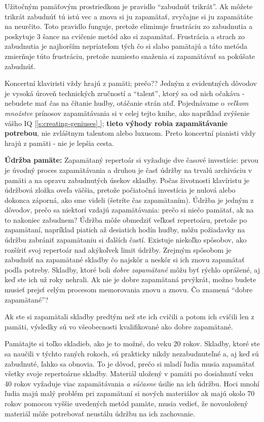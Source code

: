 \documentclass[11pt,a4paper]{book}
\newcommand*{\fullref}[1]{\hyperref[{#1}]{\ref*{#1} \nameref*{#1}}} %
\newcommand*{\fullrefp}[1]{[\fullref{#1}]} %
\begin{document}
Užitočným pamäťovým prostriedkom je pravidlo “zabudnúť trikrát”. Ak môžete trikrát zabudnúť tú istú vec a znova si ju zapamätať, zvyčajne si ju zapamätáte na neurčito. Toto pravidlo funguje, pretože eliminuje frustráciu zo zabudnutia a poskytuje 3 šance na cvičenie metód ako si zapamätať. Frustrácia a strach zo zabudnutia je najhorším nepriateľom tých čo si slabo pamätajú a táto metóda zmierňuje túto frustráciu, pretože namiesto snaženia si zapamätávať sa pokúšate zabudnúť.

Koncertní klaviristi vždy hrajú z pamäti; prečo?? Jedným z evidentných dôvodov je vysoká úroveň technických zručností a “talent”, ktorý sa od nich očakáva - nebudete mať čas na čítanie hudby, otáčanie strán atď. Pojednávame o \emph{veľkom množstve} prínosov zapamätávania si v celej tejto knihe, ako napríklad zvýšenie vášho IQ \fullrefp{s:creating-geniuses}; \textbf{tieto výhody robia zapamätávanie potrebou}, nie zvláštnym talentom alebo luxusom. Preto koncertní pianisti vždy hrajú z pamäti - nie je lepšia cesta.

\textbf{Údržba pamäte:} Zapamätaný repertoár si vyžaduje dve časové investície: prvou je úvodný proces zapamätávania a druhou je časť údržby na trvalú archiváciu v pamäti a na opravu zabudnutých úsekov skladby. Počas životnosti klavíristu je údržbová zložka oveľa väčšia, pretože počiatočná investícia je nulová alebo dokonca záporná, ako sme videli (šetríte čas zapamätaním). Údržba je jedným z dôvodov, prečo sa niektorí vzdajú zapamätávania: prečo si niečo pamätať, ak na to nakoniec zabudnem? Údržba môže obmedziť veľkosť repertoáru, pretože po zapamätaní, napríklad piatich až desiatich hodín hudby, môžu požiadavky na údržbu zabrániť zapamätaniu si ďalších častí. Existuje niekoľko spôsobov, ako rozšíriť svoj repertoár nad akýkoľvek limit údržby. Zrejmým spôsobom je zabudnúť na zapamätané skladby čo najskôr a neskôr si ich znovu zapamätať podľa potreby. Skladby, ktoré boli \emph{dobre zapamätané} môžu byť rýchlo oprášené, aj keď ste ich už roky nehrali. Ak nie je dobre zapamätaná prvýkrát, možno budete musieť prejsť celým procesom memorovania znovu a znovu. Čo znamená “dobre zapamätané”?

Ak ste si zapamätali skladby predtým než ste ich cvičili a potom ich cvičili len z pamäti, výsledky sú vo všeobecnosti kvalifikované ako dobre zapamätané.

Pamätajte si toľko skladieb, ako je to možné, do veku 20 rokov. Skladby, ktoré ste sa naučili v týchto raných rokoch, sú prakticky nikdy nezabudnuteľné a, aj keď sú zabudnuté, ľahko sa obnovia. To je dôvod, prečo si mladí ľudia musia zapamätať všetky svoje repertoárne skladby. Materiál uložený v pamäti po dosiahnutí veku 40 rokov vyžaduje viac zapamätávania \emph{a súčasne} úsilie na ich údržbu. Hoci mnohí ľudia majú malý problém pri zapamätaní si nových materiálov ak majú okolo 70 rokov pomocou vyššie uvedených metód pamäte, musia vedieť, že novouložený materiál môže potrebovať neustálu údržbu na ich zachovanie.
\end{document}
